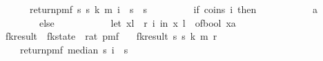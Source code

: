 \begin{isabellebody}
\ \ \ \ \ \ return{\isacharunderscore}{\kern0pt}pmf\ {\isacharparenleft}{\kern0pt}s\ s\ k{\isacharcomma}{\kern0pt}\ m{\isacharplus}{\kern0pt}{}{\isacharcomma}{\kern0pt}\ {\isasymlambda}i\ {\isasymin}\ {\isacharbraceleft}{\kern0pt}{}{\isachardot}{\kern0pt}{\isachardot}{\kern0pt}{\isacharless}{\kern0pt}s\ {\isasymtimes}\ {\isacharbraceleft}{\kern0pt}{}{\isachardot}{\kern0pt}{\isachardot}{\kern0pt}{\isacharless}{\kern0pt}s\ \isanewline
\ \ \ \ \ \ \ \ if\ coins\ i\ then\ \isanewline
\ \ \ \ \ \ \ \ \ \ {\isacharparenleft}{\kern0pt}a{\isacharcomma}{\kern0pt}{}{\isacharparenright}{\kern0pt}\ \isanewline
\ \ \ \ \ \ \ \ else\ {\isacharparenleft}{\kern0pt}\isanewline
\ \ \ \ \ \ \ \ \ \ let\ {\isacharparenleft}{\kern0pt}x{\isacharcomma}{\kern0pt}l{\isacharparenright}{\kern0pt}\ {\isacharequal}{\kern0pt}\ r\ i\ in\ {\isacharparenleft}{\kern0pt}x{\isacharcomma}{\kern0pt}\ l\ {\isacharplus}{\kern0pt}\ of{\isacharunderscore}{\kern0pt}bool\ {\isacharparenleft}{\kern0pt}x{\isacharequal}{\kern0pt}a{\isacharparenright}{\kern0pt}{\isacharparenright}{\kern0pt}\isanewline
\ \ \ \ \ \ \ \ {\isacharparenright}{\kern0pt}\isanewline
\ \ \ \ \ \ {\isacharparenright}{\kern0pt}\isanewline
\ \ \ \ {\isacharbraceright}{\kern0pt}{\isachardoublequoteclose}\isanewline
\isanewline
{}\isamarkupfalse%
\ fk{\isacharunderscore}{\kern0pt}result\ {\isacharcolon}{\kern0pt}{\isacharcolon}{\kern0pt}\ {\isachardoublequoteopen}fk{\isacharunderscore}{\kern0pt}state\ {\isasymRightarrow}\ rat\ pmf{\isachardoublequoteclose}\ \isanewline
\ \ {\isachardoublequoteopen}fk{\isacharunderscore}{\kern0pt}result\ {\isacharparenleft}{\kern0pt}s\ s\ k{\isacharcomma}{\kern0pt}\ m{\isacharcomma}{\kern0pt}\ r{\isacharparenright}{\kern0pt}\ {\isacharequal}{\kern0pt}\ \isanewline
\ \ \ \ return{\isacharunderscore}{\kern0pt}pmf\ {\isacharparenleft}{\kern0pt}median\ s\ {\isacharparenleft}{\kern0pt}{\isasymlambda}i\ {\isasymin}\ {\isacharbraceleft}{\kern0pt}{}{\isachardot}{\kern0pt}{\isachardot}{\kern0pt}{\isacharless}{\kern0pt}s\isanewline

\end{isabellebody}
